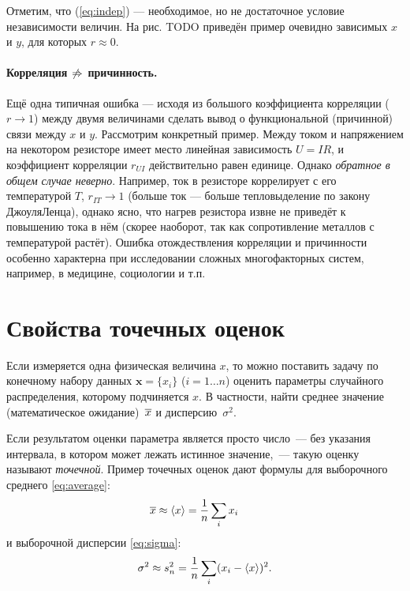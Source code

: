 Отметим, что (\ref{eq:indep}) --- необходимое,
но не достаточное условие независимости величин. На рис. TODO приведён
пример очевидно зависимых $x$ и $y$, для которых $r\approx0$.

\paragraph{Корреляция $\protect\not\Rightarrow$ причинность.}

Ещё одна типичная ошибка --- исходя из большого
коэффициента корреляции ($r\to1$) между двумя величинами сделать
вывод о функциональной (причинной) связи между $x$ и $y$. Рассмотрим
конкретный пример. Между током и напряжением на некотором резисторе
имеет место линейная зависимость $U=IR$, и коэффициент корреляции
$r_{UI}$ действительно равен единице. Однако \emph{обратное
в общем случае неверно}. Например, ток в резисторе коррелирует
с его температурой $T$, $r_{IT}\to1$ (больше ток --- больше
тепловыделение по закону Джоуля\textendash Ленца), однако ясно, что
нагрев резистора извне не приведёт к повышению тока в нём (скорее
наоборот, так как сопротивление металлов с температурой растёт). Ошибка
отождествления корреляции и причинности особенно характерна при исследовании
сложных многофакторных систем, например, в медицине, социологии и
т.п.

\section{Свойства точечных оценок} \label{sec:point}
Если измеряется одна физическая величина $x$, то можно поставить задачу
по конечному набору данных $\mathbf{x}=\{x_i\}$ ($i=1\ldots n$) оценить параметры
случайного распределения, которому подчиняется $x$. В частности,
найти среднее значение (математическое ожидание)~$\overline{x}$ и
дисперсию~$\sigma^2$.

Если результатом оценки параметра является просто число~---
без указания интервала, в котором может лежать истинное значение,~---
такую оценку называют \emph{точечной}.
Пример точечных оценок дают формулы для выборочного среднего
\eqref{eq:average}:
\begin{equation}
\overline{x} \approx \left<x\right> = \frac{1}{n}\sum_i x_i\qquad
\label{eq:estimate_x_avg}
\end{equation}
и выборочной дисперсии \eqref{eq:sigma}:
\begin{equation}
\sigma^2 \approx s^2_n = \frac{1}{n}\sum_i (x_i - \left<x\right>)^2.
\label{eq:estimate_x_sigma}
\end{equation}

